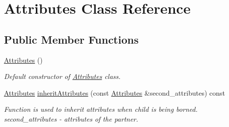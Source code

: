 \hypertarget{class_attributes}{}\section{Attributes Class Reference}
\label{class_attributes}
\subsection*{Public Member Functions}
\begin{DoxyCompactItemize}
\item 
\hyperlink{class_attributes_a81480f8fb5fa048f2f7b52f7fa9fd64e}{Attributes} ()
\begin{DoxyCompactList}\small\item\em Default constructor of \hyperlink{class_attributes}{Attributes} class. \end{DoxyCompactList}\item 
\hyperlink{class_attributes}{Attributes} \hyperlink{class_attributes_a69f4faab85246ca504afc6797b22dc4e}{inherit\+Attributes} (const \hyperlink{class_attributes}{Attributes} \&second\+\_\+attributes) const 
\begin{DoxyCompactList}\small\item\em Function is used to inherit attributes when child is being borned.  second\+\_\+attributes -\/ attributes of the partner. \end{DoxyCompactList}\end{DoxyCompactItemize}
